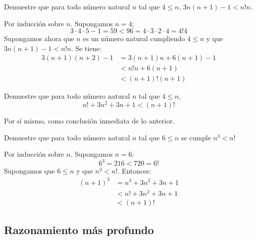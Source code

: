 \begin{exercise}
  Demuestre que para todo número natural $n$ tal que $4\leq n$,
  $3n(n+1)-1<n!n$.
\end{exercise}

\begin{solution}
  Por inducción sobre $n$. Supongamos $n=4$;
  \begin{equation*}
    3\cdot 4\cdot 5-1=59<96=4\cdot3\cdot2\cdot4=4!4
  \end{equation*}
  Supongamos ahora que $n$ es un número natural cumpliendo $4\leq n$ y
  que $3n(n+1)-1<n!n$. Se tiene:
  \begin{align*}
    3(n+1)(n+2)-1&=3(n+1)n+6(n+1)-1\\
                 &<n!n+6(n+1)\\
                 &<(n+1)!(n+1)
  \end{align*}
\end{solution}

\begin{exercise}
  Demuestre que para todo número natural $n$ tal que $4\leq n$,
  \begin{equation*}
    n!+3n^{2}+3n+1<(n+1)!
  \end{equation*}
\end{exercise}

\begin{solution}
  Por sí mismo, como conclusión inmediata de lo anterior.
\end{solution}

\begin{exercise}
  Demuestre que para todo número natural $n$ tal que $6\leq n$ se cumple $n^{3}<n!$
\end{exercise}

\begin{solution}
  Por inducción sobre $n$. Supongamos $n=6$:
  \begin{equation*}
    6^{3}=216<720=6!
  \end{equation*}
  Supongamos que $6\leq n$ y que $n^{3}<n!$. Entonces:
  \begin{align*}
    (n+1)^{3}&=n^{3}+3n^{2}+3n+1\\
             &<n!+3n^{2}+3n+1\\
             &<(n+1)!
  \end{align*}
\end{solution}

\subsection{Razonamiento más profundo}

